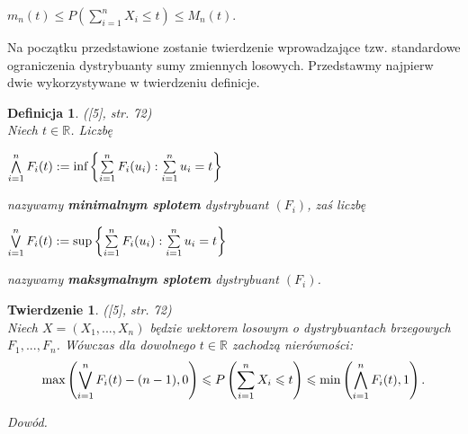 \documentclass[12pt,a4paper,openany]{book}
\newtheorem{tw}{Twierdzenie}
\newtheorem{df}{Definicja}
\begin{document}
\begin{center}
$m_{n}(t) \leqslant P \left( \sum\limits_{i=1}^{n} X_{i} \leqslant t \right) \leqslant M_{n}(t)$.
\end{center}
\newpage
Na początku przedstawione zostanie twierdzenie wprowadzające tzw. standardowe ograniczenia dystrybuanty sumy zmiennych losowych. Przedstawmy najpierw dwie wykorzystywane w twierdzeniu definicje.

\begin{df} \textnormal{([5], str. 72)}\*\\
Niech $t \in \mathbb{R}$. Liczbę
\begin{center}
$\bigwedge\limits_{i=1}^{n} F_{i}(t) := \textnormal{inf}\left\lbrace\sum\limits_{i=1}^{n} F_{i}(u_i): \sum\limits_{i=1}^{n} u_i = t\right\rbrace$
\end{center}
nazywamy \textbf{minimalnym splotem} dystrybuant $(F_{i})$, zaś liczbę
\begin{center}
$\bigvee\limits_{i=1}^{n} F_{i}(t) := \textnormal{sup}\left\lbrace\sum\limits_{i=1}^{n} F_{i}(u_i): \sum\limits_{i=1}^{n} u_i = t\right\rbrace$
\end{center}
nazywamy \textbf{maksymalnym splotem} dystrybuant $(F_{i})$.
\end{df}

\begin{tw}\textnormal{([5], str. 72)}\*\\
Niech $X = (X_{1},...,X_{n})$ będzie wektorem losowym o dystrybuantach brzegowych $F_{1},...,F_{n}$. Wówczas dla dowolnego $t \in \mathbb{R}$ zachodzą nierówności:
\begin{equation}
\textnormal{max}\left( \bigvee\limits_{i=1}^{n} F_{i}(t) - (n-1),0 \right) \leqslant P\left(\sum\limits_{i=1}^{n} X_{i} \leqslant t\right) \leqslant \textnormal{min}\left(\bigwedge\limits_{i=1}^{n} F_{i}(t), 1\right). \nonumber
\end{equation}
\end{tw}

\noindent \textit{Dowód.}
\end{document}
